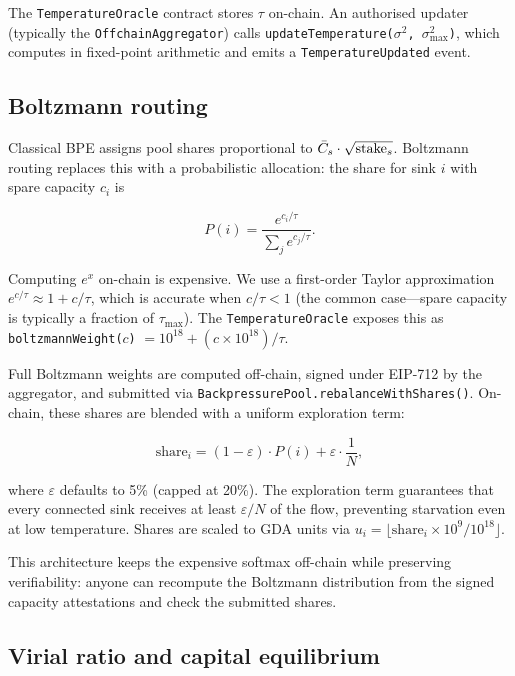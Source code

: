 The \texttt{TemperatureOracle} contract stores $\tau$ on-chain.
An authorised updater (typically the \texttt{OffchainAggregator})
calls \texttt{updateTemperature($\sigma^2$, $\sigma^2_{\max}$)},
which computes  in fixed-point arithmetic and
emits a \texttt{TemperatureUpdated} event.

\subsection{Boltzmann routing}
\label{sec:boltzmann}

Classical BPE assigns pool shares proportional to $\bar{C}_s \cdot
\sqrt{\text{stake}_s}$. Boltzmann routing replaces this with a
probabilistic allocation: the share for sink $i$ with spare capacity
$c_i$ is

\begin{equation}
  P(i) = \frac{e^{c_i / \tau}}{\sum_j e^{c_j / \tau}}.
  \label{eq:boltzmann}
\end{equation}

Computing $e^x$ on-chain is expensive. We use a first-order Taylor
approximation $e^{c/\tau} \approx 1 + c/\tau$, which is accurate when
$c/\tau < 1$ (the common case---spare capacity is typically a fraction
of $\tau_{\max}$). The \texttt{TemperatureOracle} exposes this as
\texttt{boltzmannWeight($c$)} $= 10^{18} + (c \times 10^{18})/\tau$.

Full Boltzmann weights are computed off-chain, signed under EIP-712 by
the aggregator, and submitted via
\texttt{BackpressurePool.rebalanceWithShares()}. On-chain, these
shares are blended with a uniform exploration term:

\begin{equation}
  \text{share}_i = (1 - \varepsilon) \cdot P(i) + \varepsilon \cdot \frac{1}{N},
  \label{eq:exploration}
\end{equation}

\noindent where $\varepsilon$ defaults to 5\% (capped at 20\%). The
exploration term guarantees that every connected sink receives at
least $\varepsilon / N$ of the flow, preventing starvation even at
low temperature. Shares are scaled to GDA units via $u_i = \lfloor
\text{share}_i \times 10^9 / 10^{18} \rfloor$.

This architecture keeps the expensive softmax off-chain while
preserving verifiability: anyone can recompute the Boltzmann
distribution from the signed capacity attestations and check the
submitted shares.

\subsection{Virial ratio and capital equilibrium}
\label{sec:virial}

